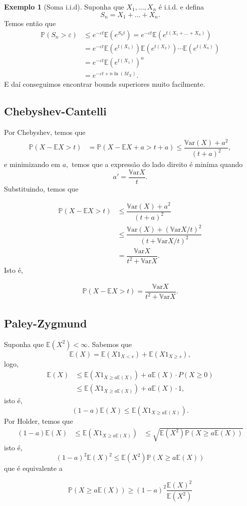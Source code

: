 \documentclass[12pt,a4paper,oneside]{book}
\theoremstyle{definition}
\newtheorem{example}[theorem]{Exemplo}
\theoremstyle{remark}
\numberwithin{equation}{section}
\newcommand{\e}{\varepsilon}
\newcommand{\E}{\mathbb{E}}
\newcommand{\pr}{\mathbb{P}}
\newcommand{\Var}{\mathbb{V}\text{ar}}
\begin{document}
\begin{example}[Soma i.i.d] Suponha que $X_1,\dots,X_n$ é i.i.d. e defina
$$S_n = X_1+\dots+X_n. $$
Temos então que
\begin{align*}
\pr(S_n>\e) & \leq  e^{-\e t}\E(e^{S_nt}) =e^{-\e t}\E(e^{t(X_1+\dots+X_n)}) \\
	&=e^{-\e t}\E(e^{t(X_1)})\E(e^{t(X_2)})\cdots\E(e^{t(X_n)})\\
	&=e^{-\e t}\E(e^{t(X_1)})^n\\
	&=e^{-\e t + n\ln(M_X)}.	
\end{align*}
E daí conseguimos encontrar bounds superiores muito facilmente.
\end{example}

\subsection{Chebyshev-Cantelli} Por Chebyshev, temos que
\begin{align*}
\pr(X-\E X> t) &= \pr(X-\E X +a> t+a) \leq \dfrac{\Var(X)+a^2}{(t+a)^2},
\end{align*}
e minimizando em $a,$ temos que a expressão do lado direito é miníma quando 
$$a' = \dfrac{\Var X}{t}.$$
Substituindo, temos que

\begin{align*}
\pr(X-\E X> t) & \leq \dfrac{\Var(X)+a^2}{(t+a)^2}\\
	& \leq \dfrac{\Var(X)+(\Var X/t)^2}{(t+\Var X/t)^2}\\
	& =  \dfrac{\Var X}{t^2+\Var X}.
\end{align*}
Isto é,

\begin{tcolorbox}
\begin{align*}
\pr(X-\E X> t) = \dfrac{\Var X}{t^2+\Var X}.
\end{align*}
\end{tcolorbox}

\subsection{Paley-Zygmund} Suponha que $\E(X^2)<\infty.$ Sabemos que 
$$\E(X) = \E (X1_{X< s}) + \E (X1_{X\geq s}), $$
logo,
\begin{align*}
\E (X) &\leq \E (X1_{X\geq a\E(X)}) + a\E(X)\cdot P(X\geq 0)\\
&\leq \E (X1_{X\geq a\E(X)}) + a\E(X)\cdot 1,
\end{align*}
isto é,
$$ (1-a)\E(X)\leq \E (X1_{X\geq a\E(X)}).$$
Por Holder, temos que
$$
\begin{array}{ccc}
(1-a)\E(X) &\leq \E (X1_{X\geq a\E(X)}) &\leq \sqrt{\E(X^2)\pr(X\geq a\E(X))} 
\end{array}
$$
isto é, 
$$(1-a)^2\E(X)^2 \leq  \E(X^2)\pr(X\geq a\E(X)) $$
que é equivalente a
\begin{tcolorbox}
$$\pr(X\geq a\E(X)) \geq (1-a)^2\dfrac{\E(X)^2}{\E(X^2)}$$
\end{tcolorbox}
\end{document}
